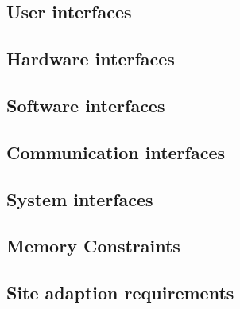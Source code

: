 \subsection{User interfaces}

\subsection{Hardware interfaces}

\subsection{Software interfaces}

\subsection{Communication interfaces}

\subsection{System interfaces}

\subsection{Memory Constraints}

\subsection{Site adaption requirements}
